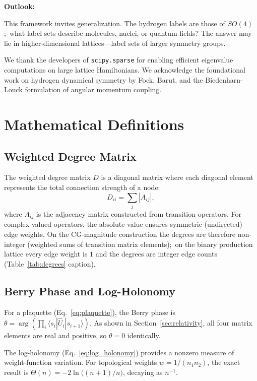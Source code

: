 \documentclass[aps,pra,twocolumn,superscriptaddress,longbibliography]{revtex4-2}
\begin{document}
\textbf{Outlook:}

This framework invites generalization. The hydrogen labels are those of $SO(4)$;\ what label sets describe molecules, nuclei, or quantum fields? The answer may lie in higher-dimensional lattices---label sets of larger symmetry groups.


\begin{acknowledgments}
We thank the developers of \texttt{scipy.sparse} for enabling efficient eigenvalue computations on large lattice Hamiltonians. We acknowledge the foundational work on hydrogen dynamical symmetry by Fock, Barut, and the Biedenharn-Louck formulation of angular momentum coupling.
\end{acknowledgments}

\appendix

\section{Mathematical Definitions}
\label{app:berry}

\subsection{Weighted Degree Matrix}

The weighted degree matrix $D$ is a diagonal matrix where each diagonal element represents the total connection strength of a node:
\begin{equation}
D_{ii} = \sum_{j} |A_{ij}|,
\end{equation}
where $A_{ij}$ is the adjacency matrix constructed from transition operators. For complex-valued operators, the absolute value ensures symmetric (undirected) edge weights. On the CG-magnitude construction the degrees are therefore non-integer (weighted sums of transition matrix elements);\ on the binary production lattice every edge weight is $1$ and the degrees are integer edge counts (Table~\ref{tab:degrees} caption).

\subsection{Berry Phase and Log-Holonomy}

For a plaquette (Eq.~\ref{eq:plaquette}), the Berry phase is
$\theta = \arg(\prod_i \langle s_i | \hat{U}_i | s_{i+1}\rangle)$.
As shown in Section~\ref{sec:relativity}, all four matrix elements are real
and positive, so $\theta = 0$ identically.

The log-holonomy (Eq.~\ref{eq:log_holonomy}) provides a nonzero measure of
weight-function variation.  For topological weights $w = 1/(n_1 n_2)$, the
exact result is $\Theta(n) = -2\ln\bigl((n+1)/n\bigr)$, decaying as
$n^{-1}$.
\end{document}

